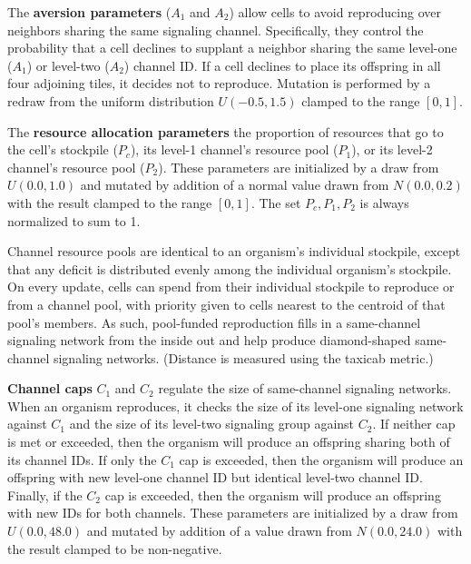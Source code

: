 The \textbf{aversion parameters} ($A_1$ and $A_2$) allow cells to avoid reproducing over neighbors sharing the same signaling channel.
Specifically, they control the probability that a cell declines to supplant a neighbor sharing the same level-one ($A_1$) or level-two ($A_2$) channel ID.
If a cell declines to place its offspring in all four adjoining tiles, it decides not to %
reproduce.
Mutation is performed by a redraw from the uniform distribution $U(-0.5,1.5)$ clamped to the range $[0,1]$.

The \textbf{resource allocation parameters} the proportion of resources that go to the cell's stockpile ($P_{c}$), its level-1 channel's resource pool ($P_1$), or its level-2 channel's resource pool ($P_2$).
These parameters are initialized by a draw from $U(0.0, 1.0)$ and mutated by addition of a normal value drawn from $N(0.0,0.2)$ with the result clamped to the range $[0,1]$.
The set $P_{c}, P_1, P_2$ is always normalized to sum to 1.

Channel resource pools are identical to an organism's individual stockpile, except that any deficit is distributed evenly among the individual organism's stockpile.
On every update, cells can spend from their individual stockpile to reproduce or from a channel pool, with priority given to cells nearest to the centroid of that pool's members.
As such, pool-funded reproduction fills in a same-channel signaling network from the inside out and help produce diamond-shaped same-channel signaling networks.
(Distance is measured using the taxicab metric.)

\textbf{
Channel caps} $C_1$ and $C_2$ regulate the size of same-channel signaling networks.
When an organism reproduces, it checks the size of its level-one signaling network against $C_1$ and the size of its level-two signaling group against $C_2$.
If neither cap is met or exceeded, then the organism will produce an offspring sharing both of its channel IDs.
If only the $C_1$ cap is exceeded, then the organism will produce an offspring with new level-one channel ID but identical level-two channel ID.
Finally, if the $C_2$ cap is exceeded, then the organism will produce an offspring with new IDs for both channels.
These parameters are initialized by a draw from $U(0.0, 48.0)$ and mutated by addition of a value drawn from $N(0.0,24.0)$ with the result clamped to be non-negative.

